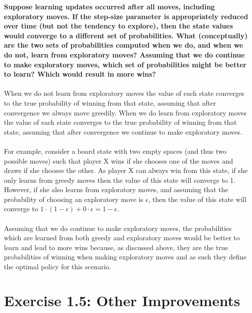 \documentclass[a4paper,11pt]{article}
\numberwithin{equation}{section}
\theoremstyle{remark}
\begin{document}
\textbf{Suppose learning updates occurred after all moves, including exploratory moves. If the step-size parameter is appropriately reduced over time (but not the tendency to explore), then the state values would converge to a different set of probabilities. What (conceptually) are the two sets of probabilities computed when we do, and when we do not, learn from exploratory moves? Assuming that we do continue to make exploratory moves, which set of probabilities might be better to learn? Which would result in more wins?}
\\ \\
When we do not learn from exploratory moves the value of each state converges to the true probability of winning from that state, assuming that after convergence we always move greedily. When we do learn from exploratory moves the value of each state converges to the true probability of winning from that state, assuming that after convergence we continue to make exploratory moves.
\\ \\
For example, consider a board state with two empty spaces (and thus two possible moves) such that player X wins if she chooses one of the moves and draws if she chooses the other. As player X can always win from this state, if she only learns from greedy moves then the value of this state will converge to 1. However, if she also learns from exploratory moves, and assuming that the probability of choosing an exploratory move is $\epsilon$, then the value of this state will converge to $1 \cdot (1-\epsilon) + 0 \cdot \epsilon = 1-\epsilon$. 
\\ \\
Assuming that we do continue to make exploratory moves, the probabilities which are learned from both greedy and exploratory moves would be better to learn and lead to more wins because, as discussed above, they are the true probabilities of winning when making exploratory moves and as such they define the optimal policy for this scenario.

\section{Exercise 1.5: Other Improvements}
\end{document}
